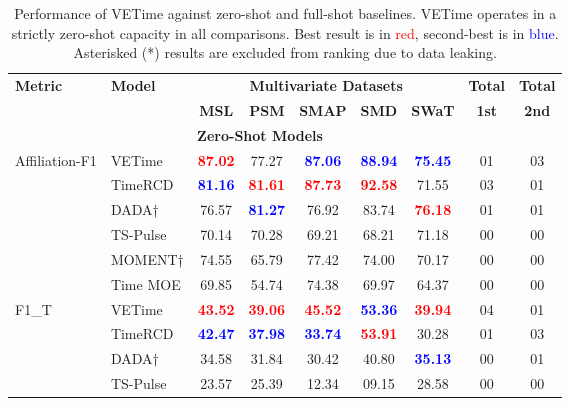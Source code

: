\documentclass{article}
\theoremstyle{plain}
\theoremstyle{definition}
\theoremstyle{remark}
\begin{document}
\begin{table}[t!]
\centering
\caption{Performance of VETime against zero-shot and full-shot baselines. VETime operates in a strictly zero-shot capacity in all comparisons. Best result is in \textcolor{red}{red}, second-best is in \textcolor{blue}{blue}. Asterisked (*) results are excluded from ranking due to data leaking.}
\label{tab:mainm}
\small
\begin{tabular}{l|l|ccccc|c|c}
    \hline
    \multirow{2}{*}{\textbf{Metric}} & \multirow{2}{*}{\textbf{Model}} & \multicolumn{5}{c|}{\textbf{Multivariate Datasets}} & \textbf{Total} & \textbf{Total} \\
    \cline{3-7}
    & & \textbf{MSL} & \textbf{PSM} & \textbf{SMAP} & \textbf{SMD} & \textbf{SWaT} & \textbf{1st} & \textbf{2nd} \\
    \hline
    \multicolumn{8}{c}{\textbf{Zero-Shot Models}} \\
    \hline
    \multirow{6}{*}{Affiliation-F1} 
    & VETime & \textcolor{red}{\textbf{87.02}} & 77.27 & \textcolor{blue}{\textbf{87.06}} & \textcolor{blue}{\textbf{88.94}} & \textcolor{blue}{\textbf{75.45}} & 01 & 03 \\
    & TimeRCD &  \textcolor{blue}{\textbf{81.16}} & \textcolor{red}{\textbf{81.61}} & \textcolor{red}{\textbf{87.73}} & \textcolor{red}{\textbf{92.58}} & 71.55 & 03 & 01 \\
    & DADA† & 76.57 & \textcolor{blue}{\textbf{81.27}} & 76.92 & 83.74 & \textcolor{red}{\textbf{76.18}} & 01 & 01 \\
    & TS-Pulse & 70.14 & 70.28 & 69.21 & 68.21 & 71.18 & 00 & 00 \\
    & MOMENT† & 74.55\rlap{*} & 65.79 & 77.42 \rlap{*}  & 74.00 \rlap{*}  & 70.17 & 00 & 00 \\
    & Time MOE & 69.85 & 54.74 & 74.38 & 69.97 & 64.37 & 00 & 00 \\
    \hline
    \multirow{6}{*}{F1\_T} 
    & VETime & \textcolor{red}{\textbf{43.52}} & \textcolor{red}{\textbf{39.06}} & \textcolor{red}{\textbf{45.52}} & \textcolor{blue}{\textbf{53.36}} & \textcolor{red}{\textbf{39.94}} & 04 & 01 \\
    & TimeRCD & \textcolor{blue}{\textbf{42.47}} & \textcolor{blue}{\textbf{37.98}} & \textcolor{blue}{\textbf{33.74}} & \textcolor{red}{\textbf{53.91}} & 30.28 & 01 & 03 \\
    & DADA† & 34.58 & 31.84& 30.42 & 40.80 & \textcolor{blue}{\textbf{35.13}} & 00 & 01 \\
    & TS-Pulse & 23.57 & 25.39 & 12.34 & 09.15 & 28.58 & 00 & 00 \\

\end{tabular}
\end{table}
\end{document}
